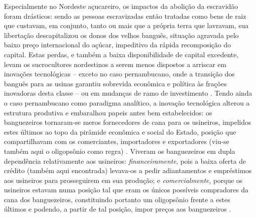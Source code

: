 Especialmente no Nordeste açucareiro, os impactos da abolição da escravidão foram drásticos: sendo as pessoas escravizadas então tratadas como bens de raiz que custavam, em conjunto, tanto ou mais que a própria terra que lavravam, sua libertação descapitalizou os donos dos velhos banguês, situação agravada pelo baixo preço internacional do açúcar, impeditivo da rápida recomposição do capital. Estas perdas, e também a baixa disponibilidade de capital excedente, levam os sucrocultores nordestinos a serem menos dispostos a arriscar em inovações tecnológicas -- exceto no caso pernambucano, onde a transição dos banguês para as usinas garantiu sobrevida econômica e política às frações inovadoras desta classe -- ou em mudanças de ramo de investimento \cite[p.~153]{CARONE1970inst}.   Tendo ainda o caso pernambucano como paradigma analítico, a inovação tecnológica alterou a estrutura produtiva e embaralhou papeis antes bem estabelecidos: os banguezeiros tornaram-se meros fornecedores de cana para os usineiros, impelidos estes últimos ao topo da pirâmide econômica e social do Estado, posição que compartilhavam com os comerciantes, importadores e exportadores (viu-se também aqui o oligopsônio como regra) \cite[p.~228]{perissinotto_cladom_1994}. Viveram os banguezeiros em dupla dependência relativamente aos usineiros: \textit{financeiramente}, pois a baixa oferta de crédito (também aqui encontrada) levava-os a pedir adiantamentos e empréstimos aos usineiros para prosseguirem em sua produção; e \textit{comercialmente}, porque os usineiros estavam numa posição tal que eram os únicos possíveis compradores da cana dos banguezeiros, constituindo portanto um oligopsônio frente a estes últimos e podendo, a partir de tal posição, impor preços aos banguezeiros \cite[pp.~228-229]{perissinotto_cladom_1994}.

